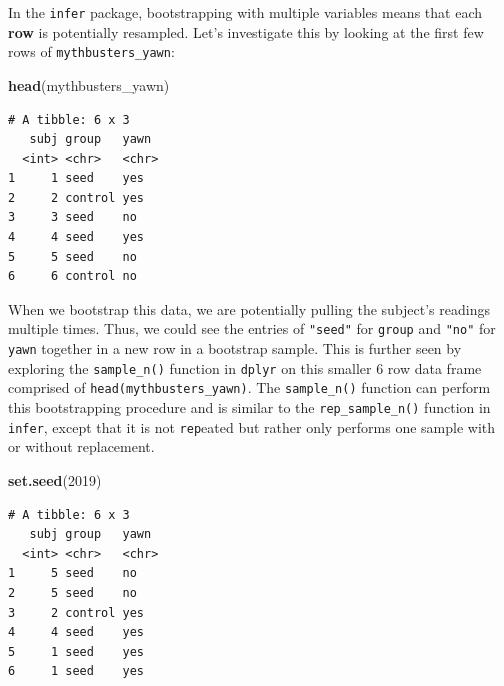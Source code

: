 \documentclass[12pt,]{krantz}
\makeatletter
\newenvironment{Shaded}{\begin{snugshade}}{\end{snugshade}}
\newcommand{\KeywordTok}[1]{\textcolor[rgb]{0.27,0.27,0.27}{\textbf{#1}}}
\newcommand{\DataTypeTok}[1]{\textcolor[rgb]{0.27,0.27,0.27}{#1}}
\newcommand{\DecValTok}[1]{\textcolor[rgb]{0.06,0.06,0.06}{#1}}
\newcommand{\StringTok}[1]{\textcolor[rgb]{0.5,0.5,0.5}{#1}}
\newcommand{\OtherTok}[1]{\textcolor[rgb]{0.37,0.37,0.37}{#1}}
\newcommand{\OperatorTok}[1]{\textcolor[rgb]{0.43,0.43,0.43}{\textbf{#1}}}
\newcommand{\NormalTok}[1]{#1}
\newenvironment{kframe}{%
\medskip{}
\setlength{\fboxsep}{.8em}
 \def\at@end@of@kframe{}%
 \ifinner\ifhmode%
  \def\at@end@of@kframe{\end{minipage}}%
  \begin{minipage}{\columnwidth}%
 \fi\fi%
 \def\FrameCommand##1{\hskip\@totalleftmargin \hskip-\fboxsep
 \colorbox{shadecolor}{##1}\hskip-\fboxsep
     \hskip-\linewidth \hskip-\@totalleftmargin \hskip\columnwidth}%
 \MakeFramed {\advance\hsize-\width
   \@totalleftmargin\z@ \linewidth\hsize
   \@setminipage}}%
 {\par\unskip\endMakeFramed%
 \at@end@of@kframe}
\renewenvironment{Shaded}{\begin{kframe}}{\end{kframe}}
\makeatother
\begin{document}
In the \texttt{infer} package, bootstrapping with multiple variables
means that each \textbf{row} is potentially resampled. Let's investigate
this by looking at the first few rows of \texttt{mythbusters\_yawn}:

\begin{Shaded}
\begin{Highlighting}[]
\KeywordTok{head}\NormalTok{(mythbusters_yawn)}
\end{Highlighting}
\end{Shaded}

\begin{verbatim}
# A tibble: 6 x 3
   subj group   yawn 
  <int> <chr>   <chr>
1     1 seed    yes  
2     2 control yes  
3     3 seed    no   
4     4 seed    yes  
5     5 seed    no   
6     6 control no   
\end{verbatim}

When we bootstrap this data, we are potentially pulling the subject's
readings multiple times. Thus, we could see the entries of
\texttt{"seed"} for \texttt{group} and \texttt{"no"} for \texttt{yawn}
together in a new row in a bootstrap sample. This is further seen by
exploring the \texttt{sample\_n()} function in \texttt{dplyr} on this
smaller 6 row data frame comprised of \texttt{head(mythbusters\_yawn)}.
The \texttt{sample\_n()} function can perform this bootstrapping
procedure and is similar to the \texttt{rep\_sample\_n()} function in
\texttt{infer}, except that it is not \texttt{rep}eated but rather only
performs one sample with or without replacement.

\begin{Shaded}
\begin{Highlighting}[]
\KeywordTok{set.seed}\NormalTok{(}\DecValTok{2019}\NormalTok{)}
\end{Highlighting}
\end{Shaded}

\begin{Shaded}
\end{Shaded}

\begin{verbatim}
# A tibble: 6 x 3
   subj group   yawn 
  <int> <chr>   <chr>
1     5 seed    no   
2     5 seed    no   
3     2 control yes  
4     4 seed    yes  
5     1 seed    yes  
6     1 seed    yes  
\end{verbatim}
\end{document}
